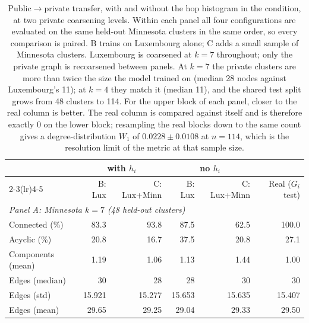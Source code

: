 
\begin{table}[H]
\centering
\caption{Public$\rightarrow$private transfer, with and without the hop histogram
in the condition, at two private coarsening levels. Within each panel all four
configurations are evaluated on the same held-out Minnesota clusters in the same
order, so every comparison is paired. B trains on Luxembourg alone; C adds a
small sample of Minnesota clusters. Luxembourg is coarsened at $k = 7$
throughout; only the private graph is recoarsened between panels. At $k = 7$ the
private clusters are more than twice the size the model trained on (median 28
nodes against Luxembourg's 11); at $k = 4$ they match it (median 11), and the
shared test split grows from 48 clusters to 114. For the upper block of each
panel, closer to the real column is better. The real column is compared against
itself and is therefore exactly $0$ on the lower block; resampling the real
blocks down to the same count gives a degree-distribution $W_1$ of
$0.0228 \pm 0.0108$ at $n = 114$, which is the resolution limit of the metric at
that sample size.}\label{tab:transfer}
\begin{tabular}{lrrrrr}
\toprule
& \multicolumn{2}{c}{with $h_i$} & \multicolumn{2}{c}{no $h_i$} & \\
\cmidrule(lr){2-3}\cmidrule(lr){4-5}
& B: Lux & C: Lux+Minn & B: Lux & C: Lux+Minn & Real ($G_i$ test) \\
\midrule
\multicolumn{6}{l}{\emph{Panel A: Minnesota $k = 7$ (48 held-out clusters)}} \\
\midrule
Connected (\%)                             & 83.3   & 93.8   & 87.5   & 62.5   & 100.0  \\
Acyclic (\%)                               & 20.8   & 16.7   & 37.5   & 20.8   & 27.1   \\
Components (mean)                          & 1.19   & 1.06   & 1.13   & 1.44   & 1.00   \\
Edges (median)                             & 30     & 28     & 28     & 30     & 30     \\
Edges (std)                                & 15.921 & 15.277 & 15.653 & 15.635 & 15.407 \\
Edges (mean)                               & 29.65  & 29.25  & 29.04  & 29.33  & 29.50  \\

\end{tabular}
\end{table}
